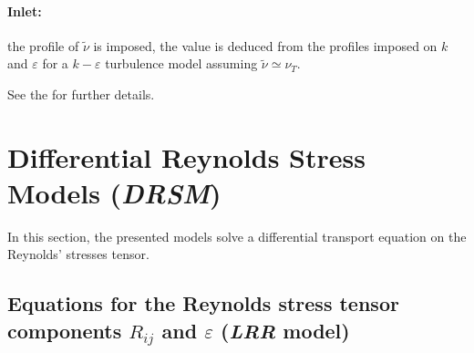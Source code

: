 \paragraph{Inlet:}
the profile of $\tilde{\nu}$ is imposed, the value is deduced from the profiles imposed on $k$ and $\varepsilon$ for a $k-\varepsilon$ turbulence
model assuming $\tilde{\nu } \simeq \nu_T$.

See the  for further details.

\section{Differential Reynolds Stress Models (\emph{DRSM})}
In this section, the presented models solve a differential transport equation
on the Reynolds' stresses tensor.
\subsection{Equations for the Reynolds stress tensor components $R_{ij}$
and $\varepsilon$ (\emph{LRR} model)}

\hypertarget{rijeps}{}
%

